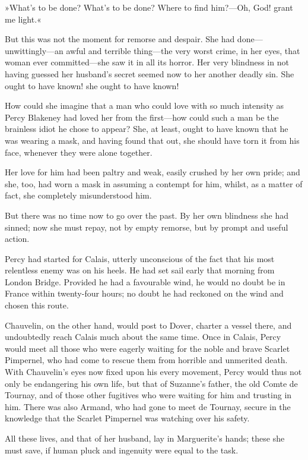 »What's to be done? What's to be done? Where to find him?\allowbreak---\allowbreak Oh, God! grant me light.«

But this was not the moment for remorse and despair. She had done\allowbreak---\allowbreak unwittingly\allowbreak---\allowbreak an awful and terrible thing\allowbreak---\allowbreak the very worst crime, in her eyes, that woman ever  committed\allowbreak---\allowbreak she saw it in all its horror. Her very blindness in not having guessed her husband's secret seemed now to her another deadly sin. She ought to have known! she ought to have known!

How could she imagine that a man who could love with so much intensity as Percy Blakeney had loved her from the first\allowbreak---\allowbreak how could such a man be the brainless idiot he chose to appear? She, at least, ought to have known that he was wearing a mask, and having found that out, she should have torn it from his face, whenever they were alone together.

Her love for him had been paltry and weak, easily crushed by her own pride; and she, too, had worn a mask in assuming a contempt for him, whilst, as a matter of fact, she completely misunderstood him.

But there was no time now to go over the past. By her own blindness she had sinned; now she must repay, not by empty remorse, but by prompt and useful action.

Percy had started for Calais, utterly unconscious of the fact that his most relentless enemy was on his heels. He had set sail early that morning from London Bridge. Provided he had a favourable wind, he would no doubt be in France within twenty-four hours; no doubt he had reckoned on the wind and chosen this route.

Chauvelin, on the other hand, would post to Dover, charter a vessel there, and undoubtedly reach Calais much about the same time. Once in Calais, Percy would meet all those who were eagerly waiting for the noble and brave Scarlet Pimpernel, who had come to rescue them from horrible and unmerited death. With Chauvelin's eyes now fixed upon his every movement, Percy would thus not only be endangering his own life, but that of Suzanne's father, the old Comte de Tournay, and of those other fugitives who were waiting for him and trusting in him. There was also Armand, who had gone to meet de Tournay, secure in the knowledge that the Scarlet Pimpernel was watching over his safety.

All these lives, and that of her husband, lay in Marguerite's hands; these she must save, if human pluck and ingenuity were equal to the task.

